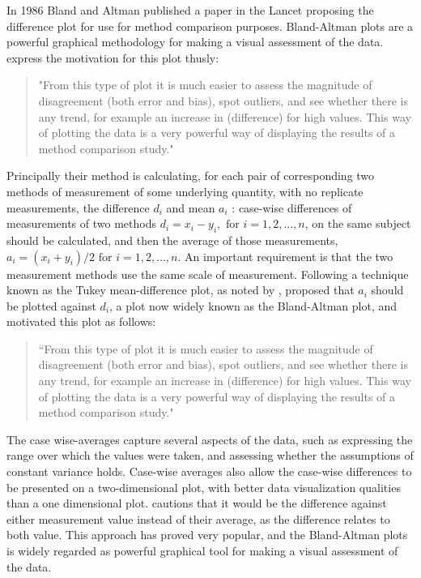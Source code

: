 \documentclass[12pt, a4paper]{report}
\theoremstyle{plain}
\theoremstyle{definition}
\theoremstyle{remark}
\begin{document}
	
In 1986 Bland and Altman published a paper in the Lancet proposing the difference plot for use for method comparison purposes. 	Bland-Altman plots are a powerful graphical methodology for making
a visual assessment of the data. \citet*{BA83} express the
motivation for this plot thusly:
\begin{quote}
	"From this type of plot it is much easier to assess the magnitude
	of disagreement (both error and bias), spot outliers, and see
	whether there is any trend, for example an increase in
	(difference) for high values. This way of plotting the data is a
	very powerful way of displaying the results of a method comparison
	study."
\end{quote}
 Principally their method is calculating, for each pair of corresponding two methods of measurement of some underlying quantity, with no replicate measurements, the difference $d_i$ and mean $a_i$ : case-wise differences of measurements of two methods $d_{i} = x_{i}-y_{i}, \mbox{ for }i=1,2,\dots,n$, on the same subject
should be calculated, and then the average of those measurements, 
$a_{i} = (x_{i} + y_{i})/2 \mbox{ for }i=1,2,\dots, n$. An important requirement is that the two measurement methods use the same scale of measurement. Following a technique known as the Tukey mean-difference plot, as noted by \citet{kozak2014including}, \citet{BA83} proposed that $a_i$ should be plotted against $d_i$, a plot now widely known as the Bland-Altman plot, and motivated this plot as follows:
	\begin{quote}
		``From this type of plot it is much easier to assess the magnitude
		of disagreement (both error and bias), spot outliers, and see
		whether there is any trend, for example an increase in (difference) for high values. This way of plotting the data is a very powerful way of displaying the results of a method comparison study."
	\end{quote}
	
	The case wise-averages capture several aspects of the data, such as expressing the range over which the values were taken, and assessing whether the assumptions of constant variance holds. Case-wise averages also allow the case-wise differences to be presented on a two-dimensional plot, with better data visualization qualities than a one dimensional plot. \citet{BA86}
	cautions that it would be the difference against either measurement value instead of their average, as the difference relates to both value. This approach has proved very popular, and the Bland-Altman plots is widely regarded as powerful graphical tool for making a visual assessment of the data.
	
\end{document}
